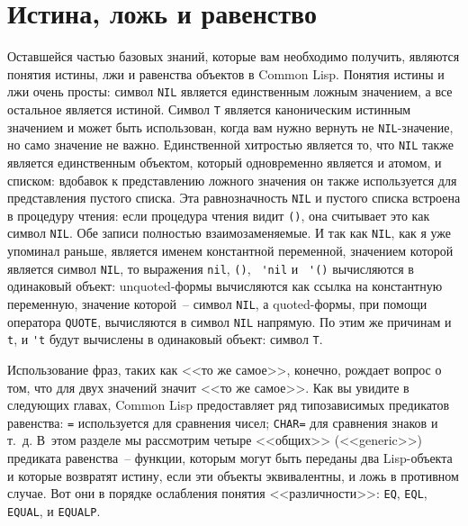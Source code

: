 \section{Истина, ложь и равенство}

Оставшейся частью базовых знаний, которые вам необходимо получить, являются понятия
истины, лжи и равенства объектов в Common Lisp. Понятия истины и лжи очень просты: символ
\lstinline{NIL} является единственным ложным значением, а все остальное является
истиной. Символ \lstinline{T} является каноническим истинным значением и может быть
использован, когда вам нужно вернуть не \lstinline{NIL}-значение, но само значение не
важно. Единственной хитростью является то, что \lstinline{NIL} также является единственным
объектом, который одновременно является и атомом, и списком: вдобавок к представлению
ложного значения он также используется для представления пустого
списка. Эта равнозначность \lstinline{NIL} и пустого
списка встроена в процедуру чтения: если процедура чтения видит \lstinline{()}, она считывает
это как символ \lstinline{NIL}. Обе записи полностью взаимозаменяемые. И так как
\lstinline{NIL}, как я уже упоминал раньше, является именем константной переменной, значением
которой является символ \lstinline{NIL}, то выражения \lstinline{nil}, \lstinline{()}, \lstinline{ 'nil} и
\lstinline{ '()} вычисляются в одинаковый объект: unquoted-формы вычисляются как ссылка на
константную переменную, значение которой~-- символ \lstinline{NIL}, а quoted-формы, при
помощи оператора \lstinline{QUOTE}, вычисляются в символ \lstinline{NIL} напрямую. По этим же
причинам и \lstinline{t}, и \lstinline{'t} будут вычислены в одинаковый объект: символ \lstinline{T}.

Использование фраз, таких как <<то же самое>>, конечно, рождает вопрос о том, что для двух
значений значит <<то же самое>>. Как вы увидите в следующих главах, Common Lisp
предоставляет ряд типозависимых предикатов равенства: \lstinline{=} используется для сравнения
чисел; \lstinline{CHAR=} для сравнения знаков и т.~д. В~этом разделе мы рассмотрим четыре <<общих>>
(<<generic>>) предиката равенства~-- функции, которым могут быть переданы два Lisp-объекта
и которые возвратят истину, если эти объекты эквивалентны, и ложь в противном случае. Вот
они в порядке ослабления понятия <<различности>>: \lstinline{EQ}, \lstinline{EQL}, \lstinline{EQUAL},
и \lstinline{EQUALP}.

